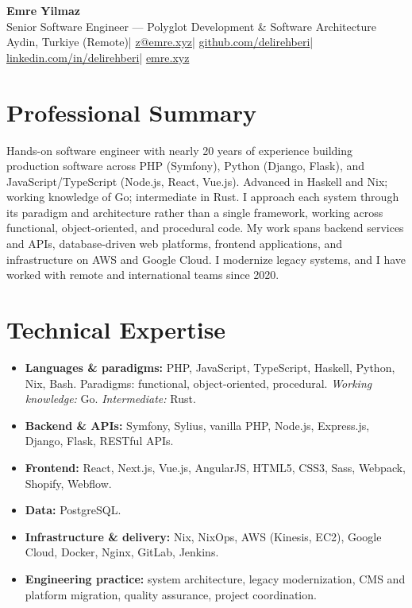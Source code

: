 \documentclass[11pt,a4paper]{article}
\begin{document}
\begin{center}
  {\LARGE\bfseries Emre Yilmaz}\\[3pt]
  {\large Senior Software Engineer --- Polyglot Development \& Software Architecture}\\[5pt]
  {\small
    Aydin, Turkiye (Remote)\enspace|\enspace
    \href{mailto:z@emre.xyz}{z@emre.xyz}\enspace|\enspace
    \href{https://github.com/delirehberi}{github.com/delirehberi}\enspace|\enspace
    \href{https://www.linkedin.com/in/delirehberi/}{linkedin.com/in/delirehberi}\enspace|\enspace
    \href{https://emre.xyz}{emre.xyz}}
\end{center}

\section{Professional Summary}
Hands-on software engineer with nearly 20 years of experience building production
software across PHP (Symfony), Python (Django, Flask), and JavaScript/TypeScript
(Node.js, React, Vue.js). Advanced in Haskell and Nix; working knowledge of Go; intermediate in Rust.
I approach each system through its paradigm and architecture rather than a single
framework, working across functional, object-oriented, and procedural code. My work
spans backend services and APIs, database-driven web platforms, frontend applications,
and infrastructure on AWS and Google Cloud. I modernize legacy systems, and I have
worked with remote and international teams since 2020.

\section{Technical Expertise}
\begin{itemize}[leftmargin=0pt, label={}, itemsep=2pt]
  \item \textbf{Languages \& paradigms:} PHP, JavaScript, TypeScript, Haskell, Python, Nix, Bash.
    Paradigms: functional, object-oriented, procedural.
    \emph{Working knowledge:} Go. \emph{Intermediate:} Rust.
  \item \textbf{Backend \& APIs:} Symfony, Sylius, vanilla PHP, Node.js, Express.js, Django, Flask, RESTful APIs.
  \item \textbf{Frontend:} React, Next.js, Vue.js, AngularJS, HTML5, CSS3, Sass, Webpack, Shopify, Webflow.
  \item \textbf{Data:} PostgreSQL.
  \item \textbf{Infrastructure \& delivery:} Nix, NixOps, AWS (Kinesis, EC2), Google Cloud, Docker, Nginx, GitLab, Jenkins.
  \item \textbf{Engineering practice:} system architecture, legacy modernization, CMS and platform migration,
    quality assurance, project coordination.
\end{itemize}
\end{document}
